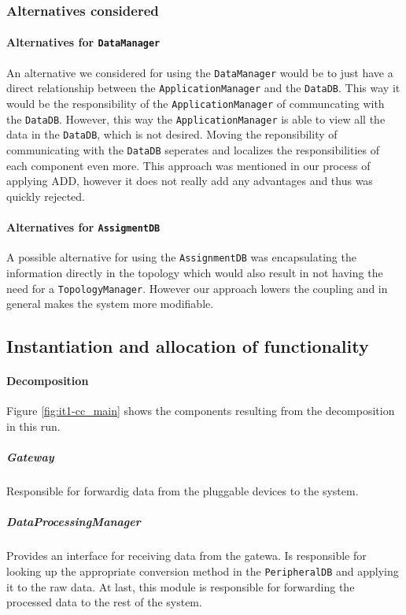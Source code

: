 \documentclass[english]{sareport}
\begin{document}
\subsubsection*{Alternatives considered}
\paragraph{Alternatives for \texttt{DataManager}}
An alternative we considered for using the \texttt{DataManager} would be to just have a direct relationship between the \texttt{ApplicationManager} and the \texttt{DataDB}. This way it would be the responsibility of the \texttt{ApplicationManager} of communcating with the \texttt{DataDB}. However, this way the \texttt{ApplicationManager} is able to view all the data in the \texttt{DataDB}, which is not desired. Moving the reponsibility of communicating with the \texttt{DataDB} seperates and localizes the responsibilities of each component even more. This approach was mentioned in our process of applying ADD, however it does not really add any advantages and thus was quickly rejected.
	
\paragraph{Alternatives for \texttt{AssigmentDB}}
A possible alternative for using the \texttt{AssignmentDB} was encapsulating the information directly in the topology which would also result in not having the need for a \texttt{TopologyManager}. However our approach lowers the coupling and in general makes the system more modifiable.

\subsection{Instantiation and allocation of functionality}
\paragraph{Decomposition}
Figure \ref{fig:it1-cc_main} shows the components resulting from the decomposition in this run. 


\subparagraph{Gateway}
Responsible for forwardig data from the pluggable devices to the system.

\subparagraph{DataProcessingManager}
Provides an interface for receiving data from the gatewa. Is responsible for looking up the appropriate conversion method in the \texttt{PeripheralDB} and applying it to the raw data. At last, this module is responsible for forwarding the processed data to the rest of the system.
\end{document}
